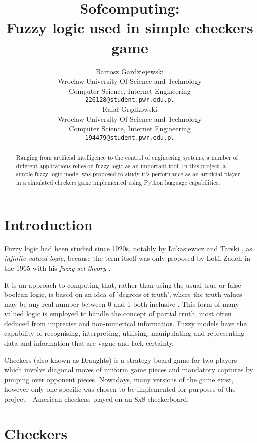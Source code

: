 \documentclass{article}
\title{Sofcomputing:\\Fuzzy logic used in simple checkers game}
\author{
  Bartosz Gardziejewski\\
  Wroclaw University Of Science and Technology\\
  Computer Science, Internet Engineering\\
  \texttt{226128@student.pwr.edu.pl} \\
   \And
  Rafał Grądkowski\\
  Wroclaw University Of Science and Technology\\
  Computer Science, Internet Engineering\\
  \texttt{194479@student.pwr.edu.pl} \\
}
\begin{document}
\maketitle

\begin{abstract}
Ranging from artificial intelligence to the control of engineering systems, a number of different applications relies on fuzzy logic as an important tool. In this project, a simple fuzzy logic model was proposed to study it's performance as an artificial player in a simulated checkers game implemented using Python language capabilities.
\end{abstract}


\section{Introduction}
Fuzzy logic had been studied since 1920s, notably by Łukasiewicz and Tarski \cite{pelletier_2000}, as \emph{infinite-valued logic}, because the term itself was only proposed by Lotfi Zadeh in the 1965 with his \emph{fuzzy set theory} \cite{ZADEH1965338, sep-logic-fuzzy}.

It is an approach to computing that, rather than using the usual true or false boolean logic, is based on an idea of 'degrees of truth', where the truth values may be any real number between 0 and 1 both inclusive \cite{math_princ}. This form of many-valued logic is employed to handle the concept of partial truth, most often deduced from imprecise and non-numerical information. Fuzzy models have the capability of recognising, interpreting, utilising, manipulating and representing data and information that are vague and lack certainty.

Checkers (also known as Draughts) is a strategy board game for two players which involve diagonal moves of uniform game pieces and mandatory captures by jumping over opponent pieces. Nowadays, many versions of the game exist, however only one specific was chosen to be implemented for purposes of the project - American checkers, played on an 8x8 checkerboard.

\section{Checkers}
\label{sec:checkers}
\end{document}
